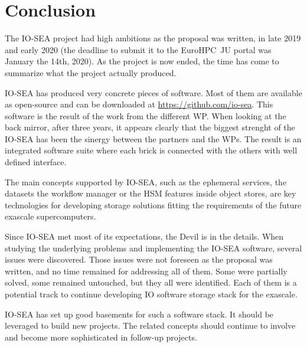 \chapter{Conclusion}

The IO-SEA project had high ambitions as the proposal was written, in late 2019 and early 2020 (the deadline
to submit it to the EuroHPC~JU portal was January the 14th, 2020). As the project is now ended, the time has come
to summarize what the project actually produced.

IO-SEA has produced very concrete pieces of software. Most of them are available as open-source and can be 
downloaded at \url{https://github.com/io-sea}. This software is the result of the work from the different WP.
When looking at the back mirror, after three years, it appears clearly that the biggest strenght of the IO-SEA
has been the sinergy between the partners and the WPs. The result is an integrated software suite where each 
brick is connected with the others with well defined interface.

The main concepts supported by IO-SEA, such as the ephemeral services, the datasets the workflow manager or the
HSM features inside object stores, are key technologies for developing storage solutions fitting the requirements
of the future exascale supercomputers.

Since IO-SEA met most of its expectations, the Devil is in the details. When studying the underlying problems and
implementing the IO-SEA software, several issues were discovered. Those issues were not foreseen as the proposal
was written, and no time remained for addressing all of them. Some were partially solved, some remained untouched,
but they all were identified. Each of them is a potential track to continue developing IO software storage stack
for the exascale. 

IO-SEA has set up good basements for such a software stack. It should be leveraged to build new projects. The
related concepts should continue to involve and become more sophisticated in follow-up projects. 